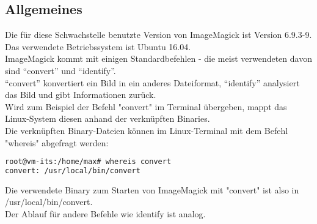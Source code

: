 \subsection{Allgemeines}\label{subsec:allgemeines}

Die für diese Schwachstelle benutzte Version von ImageMagick ist Version 6.9.3-9.\\
Das verwendete Betriebssystem ist Ubuntu 16.04.\\

ImageMagick kommt mit einigen Standardbefehlen - die meist verwendeten davon sind "`convert"' und "`identify"'.\\
"`convert"' konvertiert ein Bild in ein anderes Dateiformat, "`identify"' analysiert das Bild und gibt Informationen zurück.\\

Wird zum Beispiel der Befehl "convert" im Terminal übergeben, mappt das Linux-System diesen anhand der verknüpften Binaries.\\

Die verknüpften Binary-Dateien können im Linux-Terminal mit dem Befehl "whereis" abgefragt werden:\\

\begin{lstlisting}[language=Bash, caption=whereis Binary Abfrage,label={lst:lstlisting}]
root@vm-its:/home/max# whereis convert
convert: /usr/local/bin/convert
\end{lstlisting}
\vspace{5mm}

Die verwendete Binary zum Starten von ImageMagick mit "convert" ist also in /usr/local/bin/convert.\\
Der Ablauf für andere Befehle wie identify ist analog.\\